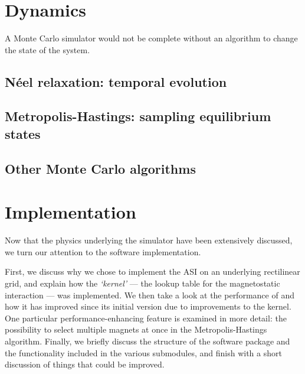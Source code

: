 \section{Dynamics}\label{sec:2:Dynamics}
A Monte Carlo simulator would not be complete without an algorithm to change the state of the system.
\subsection{N\'eel relaxation: temporal evolution}
\subsection{Metropolis-Hastings: sampling equilibrium states}
\subsection{Other Monte Carlo algorithms} %

\section{Implementation}\label{sec:2:Implementation}
Now that the physics underlying the simulator have been extensively discussed, we turn our attention to the software implementation. \par
First, we discuss why we chose to implement the ASI on an underlying rectilinear grid, and explain how the \textit{`kernel'} --- the lookup table for the magnetostatic interaction --- was implemented.
We then take a look at the performance of \hotspice and how it has improved since its initial version due to improvements to the kernel.
One particular performance-enhancing feature is examined in more detail: the possibility to select multiple magnets at once in the Metropolis-Hastings algorithm.
Finally, we briefly discuss the structure of the software package and the functionality included in the various submodules, and finish with a short discussion of things that could be improved.

